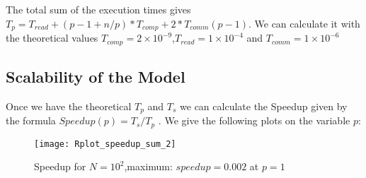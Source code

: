 \documentclass[11pt]{scrartcl} %
\begin{document}
\begin{algorithmic}

  \ENDFOR
{}
\end{algorithmic}

\ 
\begin{algorithmic}
\end{algorithmic}
\ 
\begin{algorithmic}
		  \ENDFOR
\end{algorithmic}

The total sum of the execution times gives $T_p = T_{read} + (p-1+n/p)*T_{comp}+2*T_{comm}(p-1)$. We can calculate it with the theoretical values $T_{comp} =2 \times 10^{-9}$,$T_{read}= 1 \times 10^{-4}$ and $T_{comm}= 1 \times 10^{-6}$

\subsection{Scalability of the Model}

Once we have the theoretical $T_p$ and $T_s$ we can calculate the Speedup given by the formula $Speedup(p)=T_s/T_p$ . We give the following plots on the variable $p$:


\begin{figure}[H] %
	\centering
	\texttt{[image: Rplot\_speedup\_sum\_2]} %
	\caption{Speedup for $N=10^2$,maximum: $speedup = 0.002$ at $p = 1$}
\end{figure}
\end{document}
